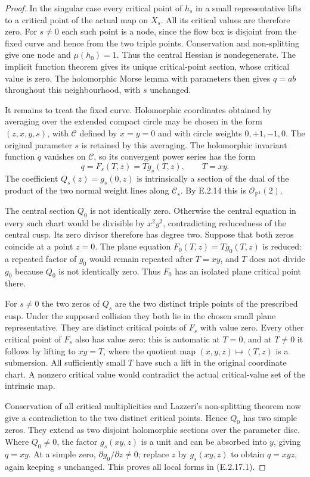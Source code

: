 \begin{proof}
In the singular case every critical point
of $h_s$ in a small representative lifts
to a critical point of the actual map
on $X_s$.  All its critical values are
therefore zero.  For $s\ne0$ each such
point is a node, since the flow box is
disjoint from the fixed curve and hence
from the two triple points.  Conservation
and non-splitting give one node and
$\mu(h_0)=1$.  Thus the central Hessian
is nondegenerate.  The implicit function
theorem gives its unique critical-point
section, whose critical value is zero.
The holomorphic Morse lemma with
parameters then gives $q=ab$ throughout
this neighbourhood, with $s$ unchanged.

It remains to treat the fixed curve.
Holomorphic coordinates obtained by
averaging over the extended compact
circle may be chosen in the form
$(z,x,y,s)$, with $\mathcal C$ defined
by $x=y=0$ and with circle weights
$0,+1,-1,0$.  The original parameter
$s$ is retained by this averaging.
The holomorphic invariant function $q$
vanishes on $\mathcal C$, so its
convergent power series has the form
\[
 q=F_s(T,z)=T g_s(T,z),\qquad T=xy.
 \tag{E.2.17.2}
\]
The coefficient
$Q_s(z)=g_s(0,z)$ is intrinsically a
section of the dual of the product of
the two normal weight lines along
$\mathcal C_s$.  By E.2.14 this is
$\mathcal O_{\mathbb P^1}(2)$.

The central section $Q_0$ is not
identically zero.  Otherwise the
central equation in every such chart
would be divisible by $x^2y^2$,
contradicting reducedness of the
central cusp.  Its zero divisor
therefore has degree two.  Suppose
that both zeros coincide at a point
$z=0$.  The plane equation
$F_0(T,z)=Tg_0(T,z)$ is reduced:
a repeated factor of $g_0$ would
remain repeated after $T=xy$, and
$T$ does not divide $g_0$ because
$Q_0$ is not identically zero.
Thus $F_0$ has an isolated plane
critical point there.

For $s\ne0$ the two zeros of $Q_s$
are the two distinct triple points
of the prescribed cusp.  Under the
supposed collision they both lie
in the chosen small plane
representative.  They are distinct
critical points of $F_s$ with value
zero.  Every other critical point
of $F_s$ also has value zero:
this is automatic at $T=0$, and
at $T\ne0$ it follows by lifting
to $xy=T$, where the quotient
map $(x,y,z)\mapsto(T,z)$ is a
submersion.  All sufficiently small
$T$ have such a lift in the original
coordinate chart.  A nonzero
critical value would contradict
the actual critical-value set of
the intrinsic map.

Conservation of all critical
multiplicities and Lazzeri's
non-splitting theorem now give a
contradiction to the two distinct
critical points.  Hence $Q_0$ has
two simple zeros.  They extend
as two disjoint holomorphic
sections over the parameter disc.
Where $Q_0\ne0$, the factor
$g_s(xy,z)$ is a unit and can
be absorbed into $y$, giving
$q=xy$.  At a simple zero,
$\partial g_0/\partial z\ne0$;
replace $z$ by $g_s(xy,z)$ to
obtain $q=xyz$, again keeping
$s$ unchanged.  This proves
all local forms in (E.2.17.1).


\end{proof}
